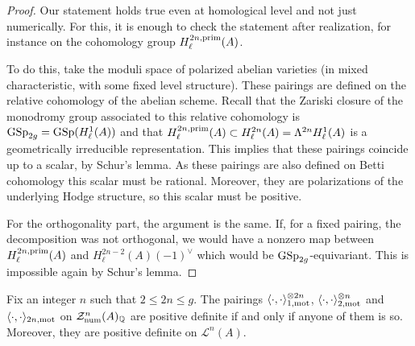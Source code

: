 \begin{proof}
 Our statement holds true even at homological level and not just numerically. For this, it is enough to check the statement after realization, for instance on the cohomology group $H_\ell^{2n,\mathrm{prim}}(A)$.

To do this, take the moduli space of polarized abelian varieties (in mixed characteristic, with some fixed level structure). These pairings are defined on  the relative cohomology of the abelian scheme. Recall that the Zariski closure of the monodromy group associated to this relative cohomology is $\textnormal{GSp}_{2g}= \textnormal{GSp}(H_\ell^{1}(A))$ and that $H_\ell^{2n,\mathrm{prim}}(A)\subset  H_\ell^{2n }(A) = \Lambda^{2n}H_\ell^{1}(A)$  is a geometrically irreducible representation. This implies that these pairings coincide up to a scalar, by Schur's lemma. As these pairings are also defined on Betti cohomology this scalar must be rational. Moreover, they are polarizations of the underlying Hodge structure, so this scalar must be positive.

For the orthogonality part, the argument is the same. If, for a fixed pairing, the decomposition was not orthogonal, we would have a nonzero map between $H_\ell^{2n,\mathrm{prim}}(A)$ and $H_\ell^{2n-2}(A)(-1)^\vee$ which would be $\textnormal{GSp}_{2g}$-equivariant. This is impossible again by Schur's lemma.
 \end{proof}
\begin{proposition}
\notready\label{oklefschetz}
Fix an integer $n$ such that   $ 2 \leq 2n\leq g.$ The pairings $\langle \cdot, \cdot \rangle_{1,\mathrm{mot} }^{\otimes 2n}$,  $\langle \cdot, \cdot \rangle_{2,\mathrm{mot}}^{\otimes n}$ and $\langle \cdot, \cdot \rangle_{2n,\mathrm{mot}} $  on  $\mathcal{Z}^{n}_{\mathrm{num}}(A)_{\mathbb{Q}}$ are positive definite if and only if anyone of them is so. Moreover, they are positive definite on $\mathcal{L}^{n}(A)$.\end{proposition}
